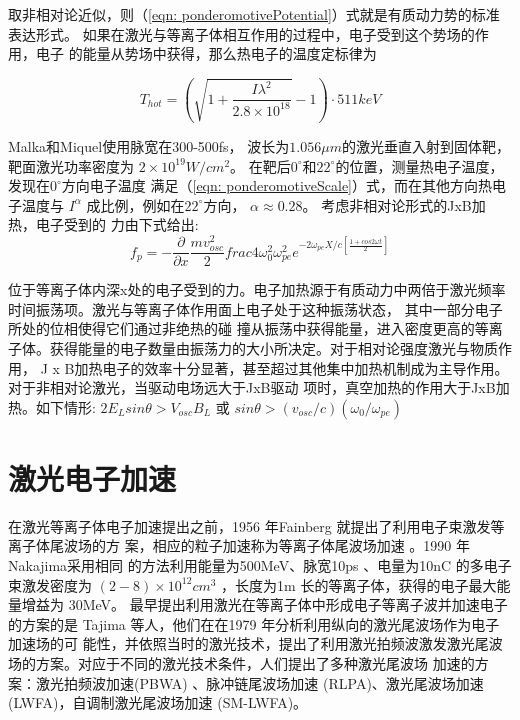 取非相对论近似，则（\ref{eqn: ponderomotivePotential}）式就是有质动力势的标准表达形式。
如果在激光与等离子体相互作用的过程中，电子受到这个势场的作用，电子
的能量从势场中获得，那么热电子的温度定标律为\cite{malka1996experimental}

\begin{equation}
\label{eqn: ponderomotiveScale}
T_{hot}=(\sqrt{1+\frac{I {\lambda}^2}{2.8 \times 10^{18}}}-1) \cdot 511 
keV
\end{equation}

Malka和Miquel\cite{malka1996experimental}使用脉宽在300-500fs，
波长为$1.056\mu m$的激光垂直入射到固体靶，靶面激光功率密度为 $2 \times 10^{19}W/{cm}^2$。
在靶后$0^\circ$和$22^\circ$的位置，测量热电子温度，发现在$0^\circ$方向电子温度
满足（\ref{eqn: ponderomotiveScale}）式，而在其他方向热电子温度与 $I^{\alpha}$ 成比例，例如在$22^\circ$方向，
$\alpha \approx 0.28$。
考虑非相对论形式的JxB加热，电子受到的
力由下式给出:
\begin{equation}
\label{eqn: ponderomotiveForce}
f_p=-{\frac{\partial}{\partial{x}}}{\frac{m v^2_{osc}}{2} 
frac{4{\omega}^2_0}{{\omega}^2_{pe}} e^{-2{\omega}_{pe} 
X/c[\frac{1+cos2\omega t}{2}]} }
\end{equation}


位于等离子体内深x处的电子受到的力。电子加热源于有质动力中两倍于激光频率时间振荡项。激光与等离子体作用面上电子处于这种振荡状态，
其中一部分电子所处的位相使得它们通过非绝热的碰
撞从振荡中获得能量，进入密度更高的等离子体。获得能量的电子数量由振荡力的大小所决定。对于相对论强度激光与物质作用， J x B加热电子的效率十分显著，甚至超过其他集中加热机制成为主导作用。对于非相对论激光，当驱动电场远大于JxB驱动
项时，真空加热的作用大于JxB加热。如下情形\cite{malka1996experimental}: $2E_Lsin\theta > V_{osc} B_L$ 或 $sin{\theta}> 
(v_{osc} / c)({\omega}_0/{\omega}_{pe})$







\section{激光电子加速}

在激光等离子体电子加速提出之前，1956 年Fainberg 就提出了利用电子束激发等离子体尾波场的方
案，相应的粒子加速称为等离子体尾波场加速\cite{esarey1996overview} 。1990 年Nakajima采用相同
的方法利用能量为500MeV、脉宽10ps 、电量为10nC 的多电子束激发密度为
$( 2-8 )\times 10^{12} {cm}^3$ ，长度为1m 长的等离子体，获得的电子最大能量增益为
30MeV\cite{nakajima1990plasma}。
最早提出利用激光在等离子体中形成电子等离子波并加速电子的方案的是
Tajima 等人，他们在在1979 年分析利用纵向的激光尾波场作为电子加速场的可
能性，并依照当时的激光技术，提出了利用激光拍频波激发激光尾波场的方案\cite{tajima1979laser}。对应于不同的激光技术条件，人们提出了多种激光尾波场
加速的方案：激光拍频波加速(PBWA)\cite{tajima1979laser, tang1985dynamics} 、脉冲链尾波场加速
(RLPA)\cite{umstadter1994nonlinear}、激光尾波场加速(LWFA)\cite{malka2002electron,geddes2004high,mangles2004monoenergetic,faure2004laser}，自调制激光尾波场加速
(SM-LWFA)\cite{sprangle1992propagation,modena1995electron}。

